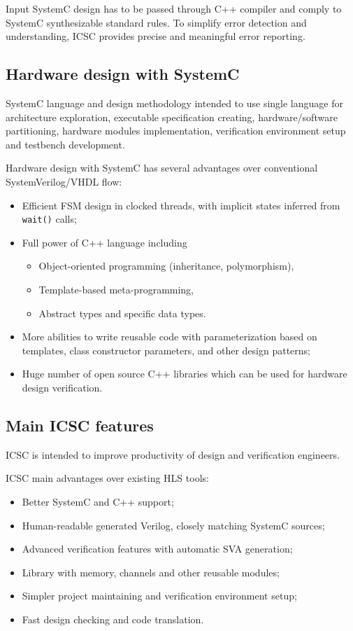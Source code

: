 Input SystemC design has to be passed through C++ compiler and comply to SystemC synthesizable standard rules. To simplify error detection and understanding, ICSC provides precise and meaningful error reporting.


\subsection{Hardware design with SystemC}

SystemC language and design methodology intended to use single language for architecture exploration, executable specification creating, hardware/software partitioning, hardware modules implementation, verification environment setup and testbench development.

Hardware design with SystemC has several advantages over conventional SystemVerilog/VHDL flow:
\begin{itemize}
\item Efficient FSM design in clocked threads, with implicit states inferred from {\tt wait()} calls;
\item Full power of C++ language including
	\begin{itemize}
	\item Object-oriented programming (inheritance, polymorphism), 
	\item Template-based meta-programming,
	\item Abstract types and specific data types.
	\end{itemize}
\item More abilities to write reusable code with parameterization based on templates, class constructor parameters, and other  design patterns; 
\item Huge number of open source C++ libraries which can be used for hardware design verification.
\end{itemize}

\subsection{Main ICSC features}

ICSC is intended to improve productivity of design and verification engineers.

ICSC main advantages over existing HLS tools: 
\begin{itemize}
\item Better SystemC and C++ support;
\item Human-readable generated Verilog, closely matching SystemC sources;
\item Advanced verification features with automatic SVA generation;
\item Library with memory, channels and other reusable modules;
\item Simpler project maintaining and verification environment setup;
\item Fast design checking and code translation.
\end{itemize}


